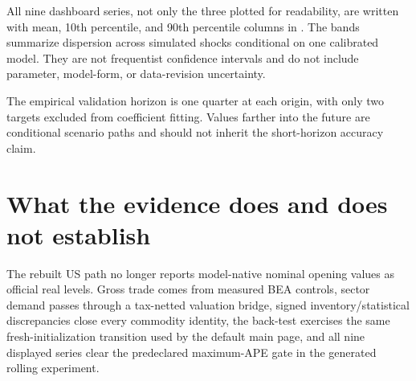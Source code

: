 \documentclass[10pt]{article}
\begin{document}
All nine dashboard series, not only the three plotted for readability, are
written with mean, 10th percentile, and 90th percentile columns in
. The bands summarize
dispersion across simulated shocks conditional on one calibrated model. They
are not frequentist confidence intervals and do not include parameter,
model-form, or data-revision uncertainty.

The empirical validation horizon is one quarter at each origin, with only two
targets excluded from coefficient fitting. Values farther into the future are
conditional scenario paths and should not inherit the short-horizon accuracy
claim.

\clearpage
\section{What the evidence does and does not establish}

\begin{resultbox}[title={What is supported}]
The rebuilt US path no longer reports model-native nominal opening values as
official real levels. Gross trade comes from measured BEA controls, sector
demand passes through a tax-netted valuation bridge, signed
inventory/statistical discrepancies close every commodity identity, the
back-test exercises the same fresh-initialization transition used by the
default main page, and all nine displayed series clear the predeclared
maximum-APE gate in the generated rolling experiment.
\end{resultbox}
\end{document}
